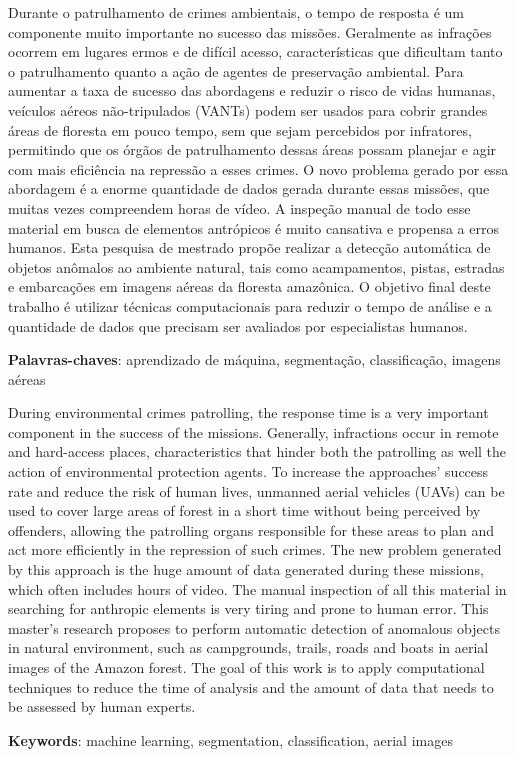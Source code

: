 \begin{resumo}
    Durante o patrulhamento de crimes ambientais, o tempo de resposta é um componente muito importante no sucesso das missões. Geralmente as infrações ocorrem em lugares ermos e de difícil acesso, características que dificultam tanto o patrulhamento quanto a ação de agentes de preservação ambiental. Para aumentar a taxa de sucesso das abordagens e reduzir o risco de vidas humanas, veículos aéreos não-tripulados (VANTs) podem ser usados para cobrir grandes áreas de floresta em pouco tempo, sem que sejam percebidos por infratores, permitindo que os órgãos de patrulhamento dessas áreas possam planejar e agir com mais eficiência na repressão a esses crimes. O novo problema gerado por essa abordagem é a enorme quantidade de dados gerada durante essas missões, que muitas vezes compreendem horas de vídeo. A inspeção manual de todo esse material em busca de elementos antrópicos é muito cansativa e propensa a erros humanos. Esta pesquisa de mestrado propõe realizar a detecção automática de objetos anômalos ao ambiente natural, tais como acampamentos, pistas, estradas e embarcações em imagens aéreas da floresta amazônica. O objetivo final deste trabalho é utilizar técnicas computacionais para reduzir o tempo de análise e a quantidade de dados que precisam ser avaliados por especialistas humanos.

    \vspace{\onelineskip}
    \noindent
    \textbf{Palavras-chaves}: aprendizado de máquina, segmentação, classificação, imagens aéreas
\end{resumo}

\begin{resumo}[Abstract]
    During environmental crimes patrolling, the response time is a very important component in the success of the missions. Generally, infractions occur in remote and hard-access places, characteristics that hinder both the patrolling as well the action of environmental protection agents. To increase the approaches' success rate and reduce the risk of human lives, unmanned aerial vehicles (UAVs) can be used to cover large areas of forest in a short time without being perceived by offenders, allowing the patrolling organs responsible for these areas to plan and act more efficiently in the repression of such crimes. The new problem generated by this approach is the huge amount of data generated during these missions, which often includes hours of video. The manual inspection of all this material in searching for anthropic elements is very tiring and prone to human error. This master's research proposes to perform automatic detection of anomalous objects in natural environment, such as campgrounds, trails, roads and boats in aerial images of the Amazon forest. The goal of this work is to apply computational techniques to reduce the time of analysis and the amount of data that needs to be assessed by human experts.
    
    \vspace{\onelineskip}
    \noindent
    \textbf{Keywords}: machine learning, segmentation, classification, aerial images
\end{resumo}
